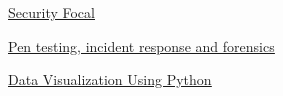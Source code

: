 \begin{coursework}
        {\href{https://www.credly.com/badges/daac71af-e2a9-40f9-9931-55359be635f5/public_url}
        {\underline{Security Focal}}}

        {\href{https://www.credly.com/badges/ae559c90-c722-4197-85b6-4d0cc0ba35ec}
        {\underline{Pen testing, incident response and forensics}}}

        {\href{https://www.credly.com/badges/bc334b4f-7eda-4e0f-b61a-82eb36d5a733}
        {\underline{Data Visualization Using Python}}}

\end{coursework}
